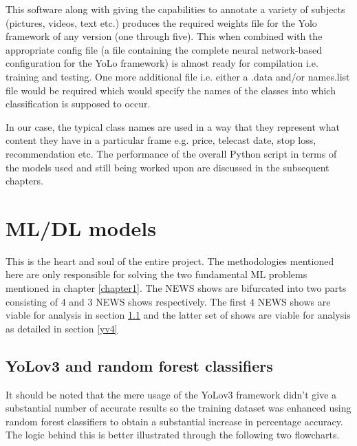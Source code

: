 This software along with giving the capabilities to annotate a variety of subjects (pictures, videos, text etc.) produces the required weights file for the Yolo framework of any version (one through five). This when combined with the appropriate config file (a file containing the complete neural network-based configuration for the YoLo framework) is almost ready for compilation i.e. training and testing. One more additional file i.e. either a .data and/or names.list file would be required which would specify the names of the classes into which classification is supposed to occur. \par

In our case, the typical class names are used in a way that they represent what content they have in a particular frame e.g. price, telecast date, stop loss, recommendation etc. The performance of the overall Python script in terms of the models used and still being worked upon are discussed in the subsequent chapters.

\section{ML/DL models}

This is the heart and soul of the entire project. The methodologies mentioned here are only responsible for solving the two fundamental ML problems mentioned in chapter \ref{chapter1}. The NEWS shows are bifurcated into two parts consisting of $4$ and $3$ NEWS shows respectively. The first $4$ NEWS shows are viable for analysis in section \ref{yv3} and the latter set of shows are viable for analysis as detailed in section \ref{yv4}

\subsection{YoLov3 and random forest classifiers} \label{yv3}

It should be noted that the mere usage of the YoLov3 framework didn’t give a substantial number of accurate results so the training dataset was enhanced using random forest classifiers to obtain a substantial increase in percentage accuracy. The logic behind this is better illustrated through the following two flowcharts.

